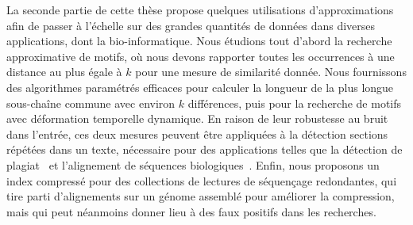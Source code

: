 La seconde partie de cette thèse propose quelques utilisations d'approximations afin de passer à l'échelle sur des grandes quantités de données dans diverses applications, dont la bio-informatique.
%
Nous étudions tout d'abord la recherche approximative de motifs, où nous devons rapporter toutes les occurrences à une distance au plus égale à $k$ pour une mesure de similarité donnée.
Nous fournissons des algorithmes paramétrés efficaces pour calculer la longueur de la plus longue sous-chaîne commune avec environ $k$ différences, puis pour la recherche de motifs avec déformation temporelle dynamique. En raison de leur robustesse au bruit dans l'entrée, ces deux mesures peuvent être appliquées à la détection sections répétées dans un texte, nécessaire pour des applications telles que la détection de plagiat~\cite{zou2010cluster} et l'alignement de séquences biologiques~\cite{leimeister2014kmacs,loose2016real,han2018accurate}.
Enfin, nous proposons un index compressé pour des collections de lectures de séquençage redondantes, qui tire parti d'alignements sur un génome assemblé pour améliorer la compression, mais qui peut néanmoins donner lieu à des faux positifs dans les recherches.